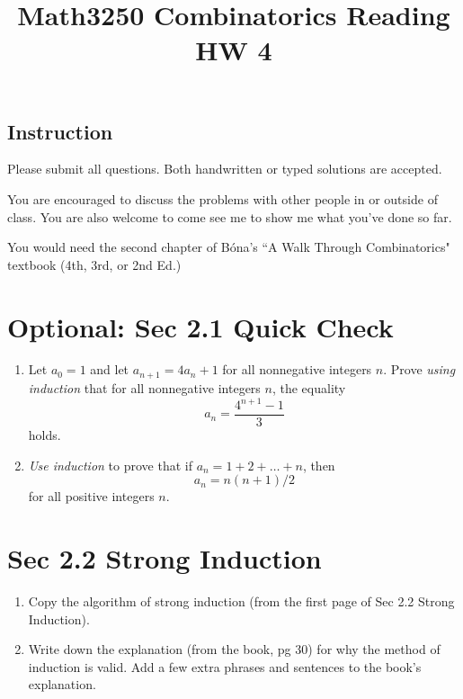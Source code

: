 \documentclass[12pt]{amsart}
\title{Math3250 Combinatorics Reading HW 4}
\begin{document}
\maketitle



\subsection*{Instruction}
Please submit all questions. Both handwritten or typed solutions are accepted.

You are encouraged to discuss the problems with other people in or outside of class. You are also welcome to come see me to show me what you've done so far.

You would need the second chapter of  B\'ona's ``A Walk Through Combinatorics" textbook (4th, 3rd, or 2nd Ed.)



\bigskip


\section{Optional: Sec 2.1 Quick Check}
\begin{enumerate}
	\item 
	Let $a_0=1$ and let $a_{n+1}=4a_n+1$ for all nonnegative integers $n$. 
	Prove \emph{using induction} that for all nonnegative integers $n$, the equality 
	\[
	a_n = \frac{4^{n+1}-1}{3}
	\]
	holds.
	
	\item 
	\emph{Use induction} to prove that if $a_n=1+2+\dots+n$, then 
	\[
	a_n = n(n+1)
	/2
	\]
	for all positive integers $n$.
\end{enumerate}

\section{Sec 2.2 Strong Induction}
\begin{enumerate}
	\item 
	Copy the algorithm of strong induction (from the first page of Sec 2.2 Strong Induction).
	
	\item Write down the explanation (from the book, pg 30) for why the method of induction is valid. Add a few extra phrases and sentences to the book's explanation.
\end{enumerate}
\end{document}
